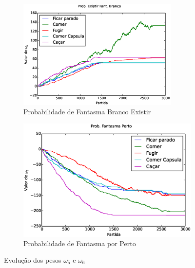 \begin{figure}[H]
	\centering
	\begin{subfigure}[t]{.5\textwidth}
		\centering
		\includegraphics[width=80mm]{images/5_behaviors_small_map/weights____pol__ProbExistirFantBranco}
		\caption{Probabilidade de Fantasma Branco Existir}
		\label{img:5ComportamentosMapaPequeno:PesoProbFantasmaBrancoExistir}
	\end{subfigure}%
	\begin{subfigure}[t]{.5\textwidth}
		\centering
		\includegraphics[width=\linewidth]{images/5_behaviors_small_map/weights____pol__ProbFantasmaPerto}
		\caption{Probabilidade de Fantasma por Perto}
		\label{img:5ComportamentosMapaPequeno:PesoProbFantasmaPorPerto}
	\end{subfigure}
	\caption{Evolução dos pesos $ \omega_5 $ e $ \omega_6 $}
	\label{img:5ComportamentosMapaPequeno:PesoProbFantasmaBrancoExistirOuNormalPerto}
\end{figure}

